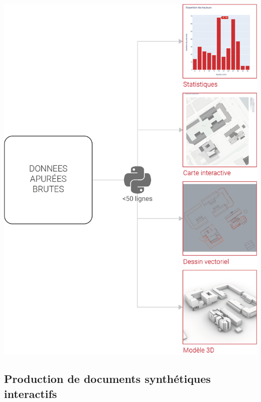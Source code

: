 \documentclass[
  11pt,
  french,
]{article}
\newcounter{customfigs}[section]
\newenvironment{customfigs}[1][] {
    \stepcounter{customfigs}
    Fig \arabic{section}. \arabic{customfigs} : }
\newcommand{\masked}{\vspace*{-\baselineskip}}
\begin{document}
\begin{tcolorbox}[title=\begin{customfigs} Moyens d'export et de synthèse des données récoltées \end{customfigs}]

\begin{center}\includegraphics[height=0.9\textheight]{__imgs/p2} \end{center}

\end{tcolorbox}

\newpage

\hypertarget{production-de-documents-synthuxe9tiques-interactifs}{%
\subsection{Production de documents synthétiques
interactifs}\label{production-de-documents-synthuxe9tiques-interactifs}}
\end{document}
